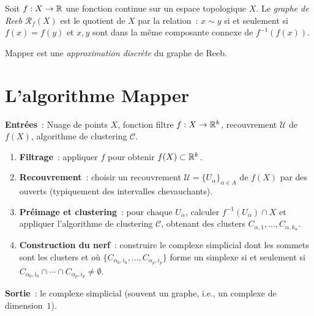 \begin{definition}
Soit $f : X \to \mathbb{R}$ une fonction continue sur un espace topologique
$X$. Le \emph{graphe de Reeb} $\mathcal{R}_f(X)$ est le quotient de
$X$ par la relation~: $x \sim y$ si et seulement si $f(x) = f(y)$ et
$x, y$ sont dans la m\^eme composante connexe de $f^{-1}(f(x))$.
\end{definition}

Mapper est une \emph{approximation discr\`ete} du graphe de Reeb.

\section{L'algorithme Mapper}

\begin{algorithme}[title=\textbf{Algorithme Mapper (Singh, M\'emoli, Carlsson, 2007)}]
\textbf{Entr\'ees}~: Nuage de points $X$, fonction filtre
$f : X \to \mathbb{R}^k$, recouvrement $\mathcal{U}$ de $f(X)$,
algorithme de clustering $\mathcal{C}$.

\begin{enumerate}
  \item \textbf{Filtrage}~: appliquer $f$ pour obtenir
        $f(X) \subset \mathbb{R}^k$.
  \item \textbf{Recouvrement}~: choisir un recouvrement
        $\mathcal{U} = \{U_\alpha\}_{\alpha \in A}$ de $f(X)$ par des
        ouverts (typiquement des intervalles chevauchants).
  \item \textbf{Pr\'eimage et clustering}~: pour chaque $U_\alpha$,
        calculer $f^{-1}(U_\alpha) \cap X$ et appliquer l'algorithme
        de clustering $\mathcal{C}$, obtenant des clusters
        $C_{\alpha,1}, \ldots, C_{\alpha, k_\alpha}$.
  \item \textbf{Construction du nerf}~: construire le complexe
        simplicial dont les sommets sont les clusters et o\`u
        $\{C_{\alpha_0, i_0}, \ldots, C_{\alpha_p, i_p}\}$ forme un
        simplexe si et seulement si
        $C_{\alpha_0, i_0} \cap \cdots \cap C_{\alpha_p, i_p} \neq \emptyset$.
\end{enumerate}
\textbf{Sortie}~: le complexe simplicial (souvent un graphe, i.e., un
complexe de dimension~$1$).
\end{algorithme}

